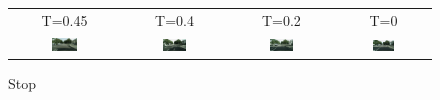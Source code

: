 \begin{figure}
\begin{tabular}{cccc}
        T=0.45 & T=0.4 & T=0.2 & T=0\\
         \includegraphics[width=0.25\textwidth]{Chapters/figures/experiments/seg_stop/0_0.44999999999999996_cond_sample.png} & \includegraphics[width=0.25\textwidth]{Chapters/figures/experiments/seg_stop/0_0.3999999999999999_cond_sample.png} & \includegraphics[width=0.25\textwidth]{Chapters/figures/experiments/seg_stop/0_0.19999999999999996_cond_sample.png}& \includegraphics[width=0.25\textwidth]{Chapters/figures/experiments/seg_stop/0_0.0_cond_sample.png} 
    \end{tabular}
    \caption{Stop}
\end{figure}

